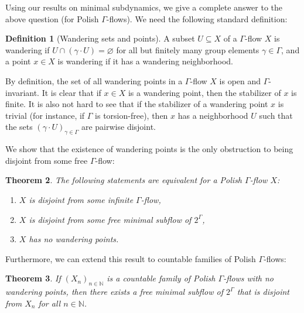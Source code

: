\documentclass[11pt,reqno,psamsfonts]{amsart}
\theoremstyle{bfnote}
\newtheorem{theo}{Theorem}[section]
\theoremstyle{definition}
\newtheorem{defn}[theo]{Definition}
\theoremstyle{remark}
\newcommand{\0}{\varnothing}
\newcommand{\bemph}[1]{{\normalfont#1}}
\newcommand{\ep}[1]{\bemph{(}#1\bemph{)}}
\newcommand{\emphd}[1]{{\fontseries{b}\selectfont\textsf{#1}}}
\newcommand{\G}{\Gamma}
\newcommand{\N}{\mathbb{N}}
\numberwithin{equation}{section}
\begin{document}
    Using our results on minimal subdynamics, we give a complete answer to the above question (for Polish $\G$-flows). We need the following standard definition:

    \begin{defn}[Wandering sets and points]
        A subset $U \subseteq X$ of a $\G$-flow $X$ is \emphd{wandering} if $U \cap (\gamma \cdot U) = \0$ for all but finitely many group elements $\gamma \in \G$, and a point $x \in X$ is \emphd{wandering} if it has a wandering neighborhood.
    \end{defn}

    By definition, the set of all wandering points in a $\G$-flow $X$ is open and $\G$-invariant. It is clear that if $x \in X$ is a wandering point, then the stabilizer of $x$ is finite. It is also not hard to see that if the stabilizer of a wandering point $x$ is trivial (for instance, if $\G$ is torsion-free), then $x$ has a neighborhood $U$ such that %
    the sets $(\gamma \cdot U)_{\gamma \in \G}$ are pairwise disjoint. %

    We show that the existence of wandering points is the only obstruction to being disjoint from some free $\G$-flow:

    \begin{tcolorbox}
    \begin{theo}\label{theo:disjoint_one}
        The following statements are equivalent for a Polish $\G$-flow $X$:
        \begin{enumerate}[label=\ep{\normalfont\arabic*}]
            \item $X$ is disjoint from some infinite $\G$-flow,
            \item $X$ is disjoint from some free minimal subflow of $2^\G$,
            \item $X$ has no wandering points.
        \end{enumerate}
    \end{theo}
    \end{tcolorbox}

    Furthermore, we can extend this result to countable families of Polish $\G$-flows:

    \begin{tcolorbox}
    \begin{theo}\label{theo:disjoint_many}
        If $(X_n)_{n \in \N}$ is a countable family of Polish $\G$-flows with no wandering points, then there exists a free minimal subflow of $2^\G$ that is disjoint from $X_n$ for all $n \in \N$.
    \end{theo}
    \end{tcolorbox}
\end{document}
